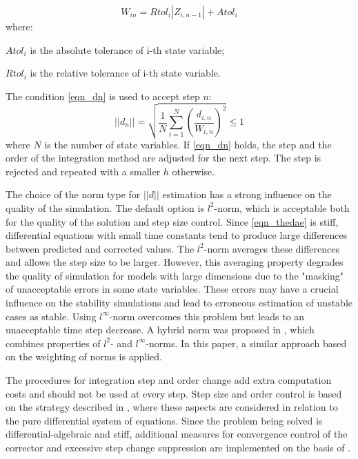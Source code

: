 \documentclass[lettersize,journal]{IEEEtran}
\begin{document}
\begin{equation}
	W_{in}=Rtol_i|Z_{i,n-1}|+Atol_i
\end{equation}
\noindent where:
\begin{description}
	\item \(Atol_i\) is the absolute tolerance of i-th state variable;
	\item \(Rtol_i\) is the relative tolerance of i-th state variable.
\end{description}

The condition \eqref{eqn_dn} is used to accept step \(n\):
\begin{equation}
	\label{eqn_dn}
	\vert\vert d_n \vert\vert = \sqrt{\frac{1}{N} \sum_{i=1}^{N}{\left(\frac{d_{i,n}}{W_{i,n}}\right)^2}} \leq 1
\end{equation}
\noindent where \(N\) is the number of state variables.
If \eqref{eqn_dn} holds, the step and the order of the integration method are adjusted for the next step. The step is rejected and repeated with a smaller \(h\) otherwise.

The choice of the norm type for \(\vert\vert d\vert\vert \) estimation has a strong influence on the quality of the simulation. The default option is \(l^2\)-norm, which is acceptable both for the quality of the solution and step size control. Since \eqref{eqn_thedae} is stiff, differential equations with small time constants tend to produce large differences between predicted and corrected values. The \(l^2\)-norm averages these differences and allows the step size to be larger.  However, this averaging property degrades the quality of simulation for models with large dimensions due to the "masking" of unacceptable errors in some state variables. These errors may have a crucial influence on the stability simulations and lead to erroneous estimation of unstable cases as stable. Using \(l^\infty\)-norm overcomes this problem but leads to an unacceptable time step decrease. A hybrid norm was proposed in \cite{pegase10}, which combines properties of \(l^2\)- and \(l^\infty\)-norms. In this paper, a similar approach based on the weighting of norms is applied.

The procedures for integration step and order change add extra computation costs and should not be used at every step. Step size and order control is based on the strategy described in \cite{Radhakrishnan1993}, where these aspects are considered in relation to the pure differential system of equations. Since the problem being solved is differential-algebraic and stiff, additional measures for convergence control of the corrector and excessive step change suppression are implemented on the basis of \cite{petzold82}.
\end{document}

